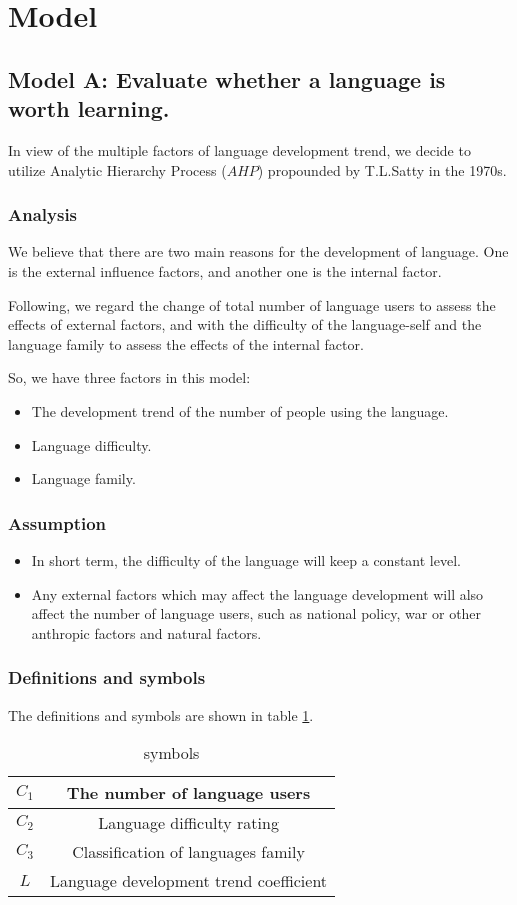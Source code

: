 \documentclass{mcmthesis}
\begin{document}
\section{Model}
\subsection{Model A: Evaluate whether a language is worth learning.}
In view of the multiple factors of language development trend, we decide to utilize Analytic Hierarchy Process ($AHP$) propounded by T.L.Satty in the 1970s.
\subsubsection{Analysis}
We believe that there are two main reasons for the development of language. One is the external influence factors, and another one is the internal factor.

Following, we regard the change of total number of language users to assess the effects of external factors, and with the difficulty of the language-self and the language family to assess the effects of the internal factor.

So, we have three factors in this model:

\begin{itemize}
\item The development trend of the number of people using the language.
\item Language difficulty.
\item Language family.
\end{itemize}

\subsubsection{Assumption}
\begin{itemize}
\item In short term, the difficulty of the language will keep a constant level.
\item Any external factors which may affect the language development will also affect the number of language users, such as national policy, war or other anthropic factors and natural factors.
\end{itemize}

\subsubsection{Definitions and symbols}
The definitions and symbols are shown in table \ref{symbols1}.
\begin{table}[!ht]
  \centering
  \begin{tabular}{ c | c }
    \hline
    $C_1$ & The number of language users \\ \hline
    $C_2$ & Language difficulty rating  \\ \hline
    $C_3$ & Classification of languages family \\  \hline
    $L$ & Language development trend coefficient  \\  \hline
  \end{tabular}
  \caption{symbols}
  \label{symbols1}
\end{table}
\end{document}
